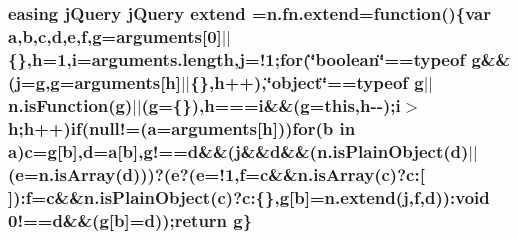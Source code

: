 \subsubsection[{extend}]{ {\bf easing} {\bf j\+Query} {\bf j\+Query} extend =n.\+fn.\+extend=function()\{var {\bf a},{\bf b},{\bf c},{\bf d},{\bf e},{\bf f},{\bf g}=arguments\mbox{[}0\mbox{]}$\vert$$\vert$\{\},{\bf h}=1,{\bf i}=arguments.\+length,{\bf j}=!1;{\bf for}(\char`\"{}boolean\char`\"{}==typeof {\bf g}\&\&({\bf j}={\bf g},{\bf g}=arguments\mbox{[}{\bf h}\mbox{]}$\vert$$\vert$\{\},{\bf h}++),\char`\"{}object\char`\"{}==typeof {\bf g}$\vert$$\vert$n.\+is\+Function({\bf g})$\vert$$\vert$({\bf g}=\{\}),{\bf h}==={\bf i}\&\&({\bf g}={\bf this},{\bf h}-\/-\/);{\bf i}$>${\bf h};{\bf h}++){\bf if}(null!=({\bf a}=arguments\mbox{[}{\bf h}\mbox{]})){\bf for}({\bf b} in {\bf a}){\bf c}={\bf g}\mbox{[}{\bf b}\mbox{]},{\bf d}={\bf a}\mbox{[}{\bf b}\mbox{]},g!=={\bf d}\&\&({\bf j}\&\&{\bf d}\&\&(n.\+is\+Plain\+Object({\bf d})$\vert$$\vert$({\bf e}=n.\+is\+Array({\bf d})))?({\bf e}?({\bf e}=!1,{\bf f}={\bf c}\&\&n.\+is\+Array({\bf c})?c\+:\mbox{[}$\,$\mbox{]})\+:{\bf f}={\bf c}\&\&n.\+is\+Plain\+Object({\bf c})?c\+:\{\},{\bf g}\mbox{[}{\bf b}\mbox{]}=n.\+extend({\bf j},{\bf f},{\bf d}))\+:void 0!=={\bf d}\&\&({\bf g}\mbox{[}{\bf b}\mbox{]}={\bf d}));return {\bf g}\}}\label{jquery-2_81_83_8min_8js_a009d4333984cde58bafc72780e410417}
\hypertarget{jquery-2_81_83_8min_8js_a4f0af84f62a6e2f4aee1d072192b48ec}{}

